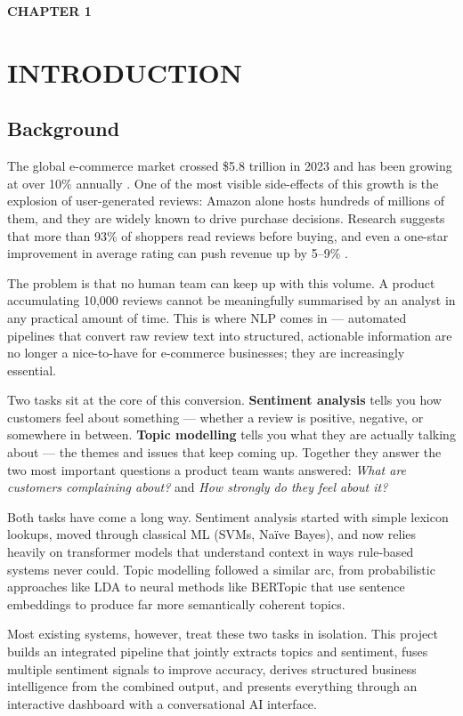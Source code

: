 \newpage
\textbf{\huge CHAPTER 1}\\
\section{INTRODUCTION}
\setcounter{section}{1}

\subsection{Background}
\begin{justify}
The global e-commerce market crossed \$5.8 trillion in 2023 and has been growing at over 10\% annually \cite{ecommerce_growth}. One of the most visible side-effects of this growth is the explosion of user-generated reviews: Amazon alone hosts hundreds of millions of them, and they are widely known to drive purchase decisions. Research suggests that more than 93\% of shoppers read reviews before buying, and even a one-star improvement in average rating can push revenue up by 5--9\% \cite{luca2016reviews}.

The problem is that no human team can keep up with this volume. A product accumulating 10,000 reviews cannot be meaningfully summarised by an analyst in any practical amount of time. This is where NLP comes in — automated pipelines that convert raw review text into structured, actionable information are no longer a nice-to-have for e-commerce businesses; they are increasingly essential.

Two tasks sit at the core of this conversion. \textbf{Sentiment analysis} tells you how customers feel about something — whether a review is positive, negative, or somewhere in between. \textbf{Topic modelling} tells you what they are actually talking about — the themes and issues that keep coming up. Together they answer the two most important questions a product team wants answered: \textit{What are customers complaining about?} and \textit{How strongly do they feel about it?}

Both tasks have come a long way. Sentiment analysis started with simple lexicon lookups, moved through classical ML (SVMs, Naïve Bayes), and now relies heavily on transformer models \cite{devlin2019bert} that understand context in ways rule-based systems never could. Topic modelling followed a similar arc, from probabilistic approaches like LDA \cite{blei2003latent} to neural methods like BERTopic \cite{grootendorst2022bertopic} that use sentence embeddings to produce far more semantically coherent topics.

Most existing systems, however, treat these two tasks in isolation. This project builds an integrated pipeline that jointly extracts topics and sentiment, fuses multiple sentiment signals to improve accuracy, derives structured business intelligence from the combined output, and presents everything through an interactive dashboard with a conversational AI interface.
\end{justify}

